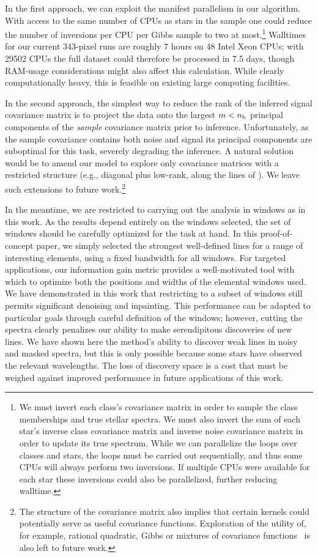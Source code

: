 \documentclass[a4paper,fleqn,usenatbib]{mnras}
\newcommand{\nb}{n_{\rm b}}
\begin{document}
In the first approach, we can exploit the manifest parallelism in our algorithm. With access to the same number of CPUs as stars in the sample one could reduce the number of inversions per CPU per Gibbs sample to two at most.\footnote{We must invert each class's covariance matrix in order to sample the class memberships and true stellar spectra. We must also invert the sum of each star's inverse class covariance matrix and inverse noise covariance matrix in order to update its true spectrum. While we can parallelize the loops over classes and stars, the loops must be carried out sequentially, and thus some CPUs will always perform two inversions. If multiple CPUs were available for each star these inversions could also be parallelized, further reducing walltime.} Walltimes for our current 343-pixel runs are roughly 7 hours on 48 Intel Xeon CPUs; with 29502 CPUs the full dataset could therefore be processed in 7.5 days, though RAM-usage considerations might also affect this calculation. While clearly computationally heavy, this is feasible on existing large computing facilities.

In the second approach, the simplest way to reduce the rank of the inferred signal covariance matrix is to project the data onto the largest $m < \nb$ principal components of the {\em sample} covariance matrix prior to inference. Unfortunately, as the sample covariance contains both noise and signal its principal components are suboptimal for this task, severely degrading the inference. A natural solution would be to amend our model to explore only covariance matrices with a restricted structure (e.g., diagonal plus low-rank, along the lines of \citet{Zhang_etal:2013}). We leave such extensions to future work.\footnote{The structure of the covariance matrix also implies that certain kernels could potentially serve as useful covariance functions. Exploration of the utility of, for example, rational quadratic, Gibbs or mixtures of covariance functions~\citep{Rasmussen_Williams} is also left to future work.}

In the meantime, we are restricted to carrying out the analysis in windows as in this work. As the results depend entirely on the windows selected, the set of windows should be carefully optimized for the task at hand. In this proof-of-concept paper, we simply selected the strongest well-defined lines for a range of interesting elements, using a fixed bandwidth for all windows. For targeted applications, our information gain metric provides a well-motivated tool with which to optimize both the positions and widths of the elemental windows used. We have demonstrated in this work that restricting to a subset of windows still permits significant denoising and inpainting. This performance can be adapted to particular goals through careful definition of the windows; however, cutting the spectra clearly penalizes our ability to make serendipitous discoveries of new lines. We have shown here the method's ability to discover weak lines in noisy and masked spectra, but this is only possible because some stars have observed the relevant wavelengths. The loss of discovery space is a cost that must be weighed against improved performance in future applications of this work.
\end{document}
